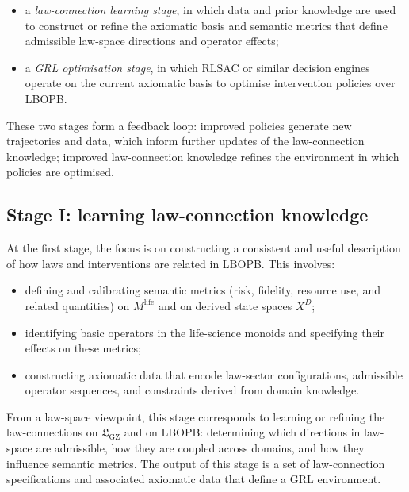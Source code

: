 \documentclass[11pt]{book}
\theoremstyle{plain}
\theoremstyle{definition}
\theoremstyle{remark}
\newcommand{\GZLS}{\ensuremath{\mathfrak{L}_{\mathrm{GZ}}}}       \newcommand{\GZLT}{\ensuremath{M_{!w}}}                           \newcommand{\GZLOC}{\ensuremath{A_M}}                             \newcommand{\GZLCurv}{\ensuremath{\mathcal{F}_{\mathrm{law}}}}
\begin{document}
\begin{itemize}
  \item a \emph{law-connection learning stage}, in which data and
        prior knowledge are used to construct or refine the axiomatic
        basis and semantic metrics that define admissible law-space
        directions and operator effects;
  \item a \emph{GRL optimisation stage}, in which RLSAC or similar
        decision engines operate on the current axiomatic basis to
        optimise intervention policies over LBOPB.
\end{itemize}

These two stages form a feedback loop: improved policies generate new
trajectories and data, which inform further updates of the law-connection
knowledge; improved law-connection knowledge refines the environment in
which policies are optimised.

\subsection*{Stage I: learning law-connection knowledge}

At the first stage, the focus is on constructing a consistent and
useful description of how laws and interventions are related in
LBOPB. This involves:

\begin{itemize}
  \item defining and calibrating semantic metrics (risk, fidelity,
        resource use, and related quantities) on $M^{\mathrm{life}}$
        and on derived state spaces $X^{D}$;
  \item identifying basic operators in the life-science monoids and
        specifying their effects on these metrics;
  \item constructing axiomatic data that encode law-sector
        configurations, admissible operator sequences, and constraints
        derived from domain knowledge.
\end{itemize}

From a law-space viewpoint, this stage corresponds to learning or
refining the \\law-connections on $\GZLS$ and on LBOPB: determining which
directions in law-space are admissible, how they are coupled across
domains, and how they influence semantic metrics. The output of this
stage is a set of law-connection specifications and associated
axiomatic data that define a GRL environment.
\end{document}
